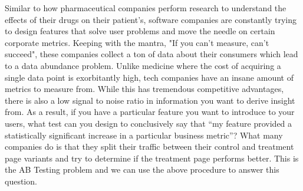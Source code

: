 Similar to how pharmaceutical companies perform research to understand the effects of their drugs on their patient's, 
software companies are constantly trying to design features that solve user problems and move the needle on certain corporate metrics. 
Keeping with the mantra, "If you can’t measure, can’t succeed", these companies collect a ton of data about their consumers which lead 
to a data abundance problem. Unlike medicine where the cost of acquiring a single data point is exorbitantly high,
tech companies have an insane amount of metrics to measure from. While this has tremendous competitive advantages, 
there is also a low signal to noise ratio in information you want to derive insight from. As a result, if you have a 
particular feature you want to introduce to your users, what test can you design to conclusively say that 
“my feature provided a statistically significant increase in a particular business metric”? What many companies 
do is that they split their traffic between their control and treatment page variants and try to determine if the 
treatment page performs better.  This is the AB Testing problem and we can use the above procedure to answer this question.


